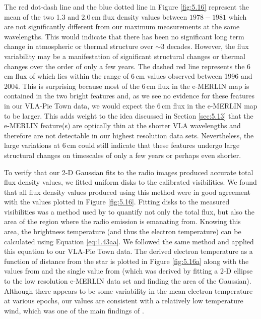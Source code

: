 The red dot-dash line and the blue dotted line in Figure \ref{fig:5.16} represent the mean of the two 1.3 and 2.0\,cm flux density values between $1978-1981$  \citep{newell_1982} which are not significantly different from our maximum measurements at the same wavelengths. This would indicate that there has been no significant long term change in atmospheric or thermal structure over $\sim 3$ decades. However, the flux variability may be a manifestation of significant structural changes or thermal changes over the order of only a few years. The dashed red line represents the 6\,cm flux of \cite{richards_2013} which lies within the range of 6\,cm values observed between 1996 and 2004. This is surprising because most of the 6\,cm flux in the e-MERLIN map is contained in the two bright features and, as we see no evidence for these features in our VLA-Pie Town data, we would expect the 6\,cm flux in the e-MERLIN map to be larger. This adds weight to the idea discussed in Section \ref{sec:5.13} that the e-MERLIN feature(s) are optically thin at the shorter VLA wavelengths and therefore are not detectable in our highest resolution data sets. Nevertheless, the large variations at 6\,cm could still indicate that these features undergo large structural changes on timescales of only a few years or perhaps even shorter.

To verify that our 2-D Gaussian fits to the radio images produced accurate total flux density values, we fitted uniform disks to the calibrated visibilities. We found that all flux density values produced using this method were in good agreement with the values plotted in Figure \ref{fig:5.16}. Fitting disks to the measured visibilities was a method used by \cite{lim_1998} to quantify not only the total flux, but also the area of the region where the radio emission is emanating from. Knowing this area, the brightness temperature (and thus the electron temperature) can be calculated using Equation \ref{eq:1.43aa}. We followed the same method and applied this equation to our VLA-Pie Town data. The derived electron temperature as a function of distance from the star is plotted in Figure \ref{fig:5.16a} along with the values from \cite{lim_1998} and the single value from \cite{richards_2013} (which was derived by fitting a 2-D ellipse to the low resolution e-MERLIN data set and finding the area of the Gaussian). Although there appears to be some variability in the mean electron temperature at various epochs, our values are consistent with a relatively low temperature wind, which was one of the main findings of \cite{lim_1998}. 


